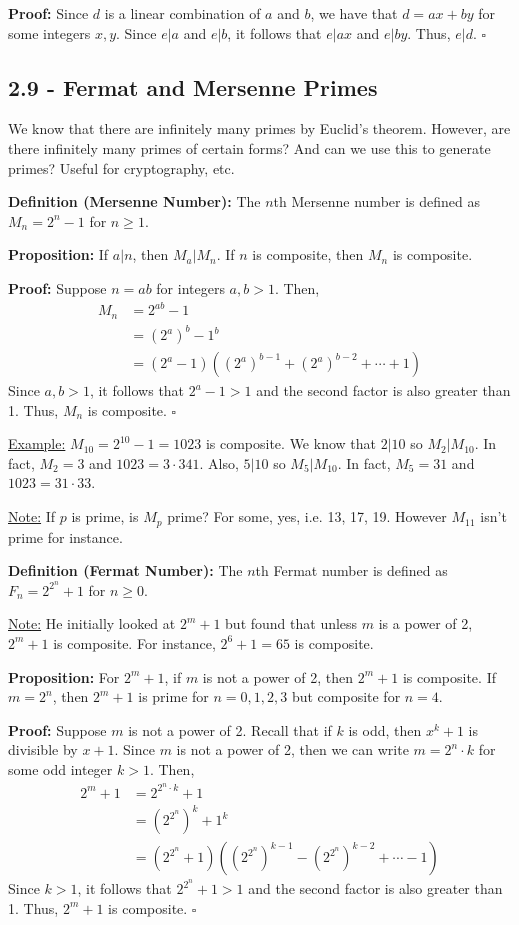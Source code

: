 \documentclass{article}
\newcommand*{\qed}{\hfill$\square$}%
\begin{document}
\textbf{Proof:} Since $d$ is a linear combination of $a$ and $b$, we have that $d = ax + by$ for some integers $x,y$. Since $e|a$ and $e|b$, it follows that $e|ax$ and $e|by$. Thus, $e|d$. \qed

\subsection{2.9 - Fermat and Mersenne Primes}

We know that there are infinitely many primes by Euclid's theorem. However, are there infinitely many primes of certain forms? And can we use this to generate primes? Useful for cryptography, etc. 

\textbf{Definition (Mersenne Number):} The $n$th Mersenne number is defined as $M_n = 2^n - 1$ for $n\geq 1$.

\textbf{Proposition:} If $a|n$, then $M_a|M_n$. If $n$ is composite, then $M_n$ is composite.

\textbf{Proof:} Suppose $n=ab$ for integers $a,b>1$. Then, \begin{align*}
    M_n &= 2^{ab} - 1 \\
        &= (2^a)^b - 1^b \\
        &= (2^a - 1)\left( (2^a)^{b-1} + (2^a)^{b-2} + \cdots + 1 \right)
\end{align*}
Since $a,b>1$, it follows that $2^a - 1 > 1$ and the second factor is also greater than 1. Thus, $M_n$ is composite. \qed

\underline{Example:} $M_10 = 2^{10} - 1 = 1023$ is composite. We know that $2|10$ so $M_2|M_{10}$. In fact, $M_2=3$ and $1023=3\cdot 341$. Also, $5|10$ so $M_5|M_{10}$. In fact, $M_5=31$ and $1023=31\cdot 33$.

\underline{Note:} If $p$ is prime, is $M_p$ prime? For some, yes, i.e. 13, 17, 19. However $M_{11}$ isn't prime for instance. 

\textbf{Definition (Fermat Number):} The $n$th Fermat number is defined as $F_n = 2^{2^n} + 1$ for $n\geq 0$.

\underline{Note:} He initially looked at $2^m+1$ but found that unless $m$ is a power of 2, $2^m+1$ is composite. For instance, $2^6+1=65$ is composite.

\textbf{Proposition:} For $2^m+1$, if $m$ is not a power of 2, then $2^m+1$ is composite. If $m=2^n$, then $2^m+1$ is prime for $n=0,1,2,3$ but composite for $n=4$.

\textbf{Proof:} Suppose $m$ is not a power of 2. Recall that if $k$ is odd, then $x^k+1$ is divisible by $x+1$. Since $m$ is not a power of 2, then we can write $m=2^n\cdot k$ for some odd integer $k>1$. Then, \begin{align*}
    2^m + 1 &= 2^{2^n\cdot k} + 1 \\
            &= (2^{2^n})^k + 1^k \\
            &= (2^{2^n} + 1)\left( (2^{2^n})^{k-1} - (2^{2^n})^{k-2} + \cdots - 1 \right)
\end{align*}
Since $k>1$, it follows that $2^{2^n} + 1 > 1$ and the second factor is also greater than 1. Thus, $2^m + 1$ is composite. \qed
\end{document}
